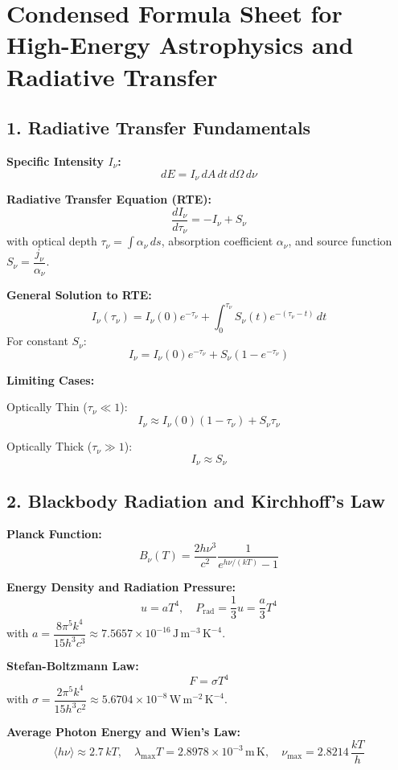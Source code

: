 \documentclass{article}
\begin{document}
\section*{Condensed Formula Sheet for High-Energy Astrophysics and Radiative Transfer}

\subsection*{1. Radiative Transfer Fundamentals}

\textbf{Specific Intensity \( I_\nu \):}
\[
    dE = I_\nu \, dA \, dt \, d\Omega \, d\nu
\]

\textbf{Radiative Transfer Equation (RTE):}
\[
    \frac{dI_\nu}{d\tau_\nu} = -I_\nu + S_\nu
\]
with optical depth \( \tau_\nu = \int \alpha_\nu \, ds \), absorption coefficient \( \alpha_\nu \), and source function \( S_\nu = \dfrac{j_\nu}{\alpha_\nu} \).

\textbf{General Solution to RTE:}
\[
    I_\nu(\tau_\nu) = I_\nu(0) e^{-\tau_\nu} + \int_0^{\tau_\nu} S_\nu(t) e^{-(\tau_\nu - t)} \, dt
\]
For constant \( S_\nu \):
\[
    I_\nu = I_\nu(0) e^{-\tau_\nu} + S_\nu (1 - e^{-\tau_\nu})
\]

\textbf{Limiting Cases:}

Optically Thin (\( \tau_\nu \ll 1 \)):
\[
    I_\nu \approx I_\nu(0)(1 - \tau_\nu) + S_\nu \tau_\nu
\]

Optically Thick (\( \tau_\nu \gg 1 \)):
\[
    I_\nu \approx S_\nu
\]

\subsection*{2. Blackbody Radiation and Kirchhoff's Law}

\textbf{Planck Function:}
\[
    B_\nu(T) = \frac{2h\nu^3}{c^2} \frac{1}{e^{h\nu/(kT)} - 1}
\]

\textbf{Energy Density and Radiation Pressure:}
\[
    u = a T^4, \quad P_{\text{rad}} = \frac{1}{3} u = \frac{a}{3} T^4
\]
with \( a = \dfrac{8\pi^5 k^4}{15 h^3 c^3} \approx 7.5657 \times 10^{-16} \, \mathrm{J\,m^{-3}\,K^{-4}} \).

\textbf{Stefan-Boltzmann Law:}
\[
    F = \sigma T^4
\]
with \( \sigma = \dfrac{2\pi^5 k^4}{15 h^3 c^2} \approx 5.6704 \times 10^{-8} \, \mathrm{W\,m^{-2}\,K^{-4}} \).

\textbf{Average Photon Energy and Wien's Law:}
\[
    \langle h\nu \rangle \approx 2.7\,kT, \quad \lambda_{\text{max}} T = 2.8978 \times 10^{-3} \, \mathrm{m\,K}, \quad \nu_{\text{max}} = 2.8214 \, \frac{k T}{h}
\]
\end{document}

